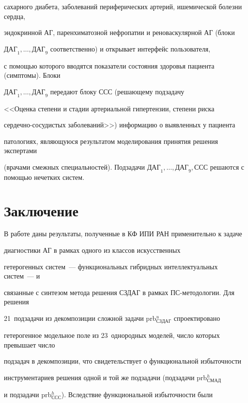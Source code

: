 сахарного диабета, заболеваний периферических артерий, ишемической болезни сердца,


эндокринной АГ, паренхиматозной нефропатии и реноваскулярной АГ (блоки


$\mathrm{ДАГ}_1, \ldots , \mathrm{ДАГ}_9$ соответственно) и открывает интерфейс пользователя,


с помощью которого вводятся показатели состояния здоровья пациента (симптомы). Блоки


$\mathrm{ДАГ}_1, \ldots , \mathrm{ДАГ}_9$ передают блоку ССС (решающему подзадачу


<<Оценка степени и стадии артериальной гипертензии, степени риска


 сер\-деч\-но-со\-су\-ди\-стых заболеваний>>) информацию о выявленных у пациента


патологиях, являющуюся результатом моделирования принятия решения экспертами


(врачами смежных специальностей). Подзадачи $\mathrm{ДАГ}_1, \ldots , \mathrm{ДАГ}_9,


\mathrm{ССС}$ решаются с помощью нечетких систем.





\section{Заключение}





 В работе даны результаты, полученные в КФ ИПИ РАН применительно к задаче


диагностики АГ в рамках одного из классов искусственных


гетерогенных сис\-тем~--- функциональных гибридных интеллектуальных сис\-тем~--- и


связанные с синтезом метода решения СЗДАГ в рамках ПС-ме\-то\-до\-ло\-гии. Для решения


21~подзадачи из декомпозиции сложной задачи prb$^u_{\mathrm{СЗДАГ}}$ спроектировано


гетерогенное модельное поле из 23~однородных моделей, число которых превышает число


подзадач в декомпозиции, что свидетельствует о функциональной избыточности


инструментариев решения одной и той же подзадачи (подзадачи prb$^h_{\mathrm{СМАД}}$


и подзадачи prb$^h_{\mathrm{ССС}}$). Вследствие функциональной избыточности были


